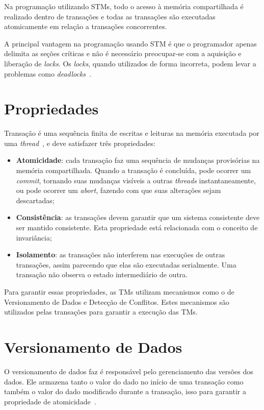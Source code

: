 \documentclass[diss,capa]{texufpel}
\begin{document}
Na programação utilizando STMs, todo o acesso à memória compartilhada é realizado dentro de transações e todas as transações são executadas atomicamente em relação a transações concorrentes.

A principal vantagem na programação usando STM é que o programador apenas delimita as seções críticas e não é necessário preocupar-se com a aquisição e liberação de \emph{locks}. Os \emph{locks}, quando utilizados de forma incorreta, podem levar a problemas como \emph{deadlocks}~\cite{BAND10}.

\section{Propriedades}

Transação é uma sequência finita de escritas e leituras na memória executada por uma \emph{thread}~\cite{herlihy93}, e deve satisfazer três propriedades:

\begin{itemize}
\item \textbf{Atomicidade}: cada transação faz uma sequência de mudanças provisórias na memória compartilhada. Quando a transação é concluída, pode ocorrer um \emph{commit}, tornando suas mudanças visíveis a outras \emph{threads} instantaneamente, ou pode ocorrer um \emph{abort}, fazendo com que suas alterações sejam descartadas;

\item \textbf{Consistência}: as transações devem garantir que um sistema consistente deve ser mantido consistente. Esta propriedade está relacionada com o conceito de invariância;

\item \textbf{Isolamento}: as transações não interferem nas execuções de outras transações, assim parecendo que elas são executadas serialmente. Uma transação não observa o estado intermediário de outra.
\end{itemize}

Para garantir essas propriedades, as TMs utilizam mecanismos como o de Versionamento de Dados e Detecção de Conflitos. Estes mecanismos são utilizados pelas transações para garantir a execução das TMs.

\section{Versionamento de Dados}

O versionamento de dados faz é responsável pelo gerenciamento das versões dos dados. Ele armazena tanto o valor do dado no início de uma transação como também o valor do dado modificado durante a transação, isso para garantir a propriedade de atomicidade~\cite{BaldassinTese2009}.
\end{document}
